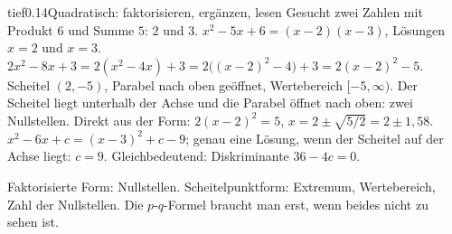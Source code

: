 \begin{loesungkarte}{tief}{0.14}{Quadratisch: faktorisieren, ergänzen, lesen}
Gesucht zwei Zahlen mit Produkt $6$ und Summe $5$: $2$ und $3$. $x^{2} - 5x + 6 = (x - 2)(x - 3)$, Lösungen $x = 2$ und $x = 3$.
$2x^{2} - 8x + 3 = 2(x^{2} - 4x) + 3 = 2\bigl((x - 2)^{2} - 4\bigr) + 3 = 2(x - 2)^{2} - 5$. Scheitel $(2, -5)$, Parabel nach oben geöffnet, Wertebereich $[-5, \infty)$.
Der Scheitel liegt unterhalb der Achse und die Parabel öffnet nach oben: zwei Nullstellen. Direkt aus der Form: $2(x - 2)^{2} = 5$, $x = 2\pm\sqrt{5/2} = 2\pm1{,}58$.
$x^{2} - 6x + c = (x - 3)^{2} + c - 9$; genau eine Lösung, wenn der Scheitel auf der Achse liegt: $c = 9$. Gleichbedeutend: Diskriminante $36 - 4c = 0$.
\begin{center}
\end{center}
\begin{mitnehmen}\kastentext
Faktorisierte Form: Nullstellen. Scheitelpunktform: Extremum, Wertebereich, Zahl der Nullstellen. Die $p$-$q$-Formel braucht man erst, wenn beides nicht zu sehen ist.
\end{mitnehmen}
\end{loesungkarte}

